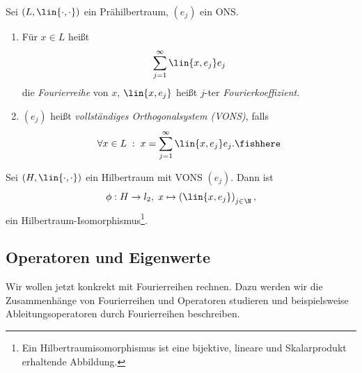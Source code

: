 \begin{defn}
\label{defn:1.12}
Sei $(L,\lin{\cdot,\cdot})$ ein Prähilbertraum, $(e_j)$ ein ONS.
\begin{enumerate}[label=\arabic{*}.)]
  \item Für $x\in L$ heißt
\begin{align*}
\sum\limits_{j=1}^\infty \lin{x,e_j}e_j
\end{align*}
die \emph{Fourierreihe} von $x$, $\lin{x,e_j}$ heißt $j$-ter
\emph{Fourierkoeffizient}.
\item $(e_j)$ heißt \emph{vollständiges Orthogonalsystem (VONS)}, falls
\begin{align*}
\forall x\in L\; :\; x = \sum\limits_{j=1}^\infty \lin{x,e_j}e_j.\fishhere
\end{align*}
\end{enumerate}
\end{defn}

\begin{prop}
\label{prop:1.13}
Sei $(H,\lin{\cdot,\cdot})$ ein Hilbertraum mit VONS $(e_j)$. Dann ist
\begin{align*}
\phi: H\to l_2,\; x\mapsto \left(\lin{x,e_j}\right)_{j\in\N},
\end{align*}
ein Hilbertraum-Isomorphismus\footnote{Ein Hilbertraumisomorphismus ist eine
bijektive, lineare und Skalarprodukt erhaltende Abbildung.}.\fishhere
\end{prop}

\subsection{Operatoren und Eigenwerte}

Wir wollen jetzt konkrekt mit Fourierreihen rechnen. Dazu werden wir die
Zusammenhänge von Fourierreihen und Operatoren studieren und beispielsweise
Ableitungsoperatoren durch Fourierreihen beschreiben.


